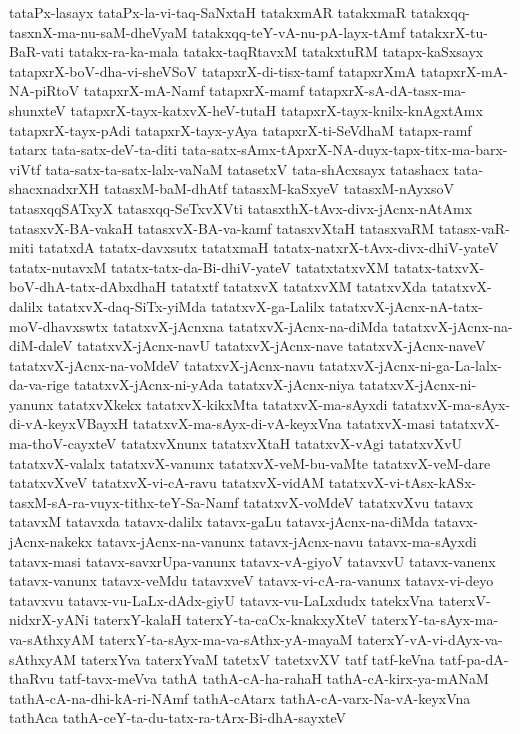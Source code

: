 {tataPx-lasayx
tataPx-la-vi-taq-SaNxtaH
tatakxmAR
tatakxmaR
tatakxqq-tasxnX-ma-nu-saM-dheVyaM
tatakxqq-teY-vA-nu-pA-layx-tAmf
tatakxrX-tu-BaR-vati
tatakx-ra-ka-mala
tatakx-taqRtavxM
tatakxtuRM
tatapx-kaSxsayx
tatapxrX-boV-dha-vi-sheVSoV
tatapxrX-di-tisx-tamf
tatapxrXmA
tatapxrX-mA-NA-piRtoV
tatapxrX-mA-Namf
tatapxrX-mamf
tatapxrX-sA-dA-tasx-ma-shunxteV
tatapxrX-tayx-katxvX-heV-tutaH
tatapxrX-tayx-knilx-knAgxtAmx
tatapxrX-tayx-pAdi
tatapxrX-tayx-yAya
tatapxrX-ti-SeVdhaM
tatapx-ramf
tatarx
tata-satx-deV-ta-diti
tata-satx-sAmx-tApxrX-NA-duyx-tapx-titx-ma-barx-viVtf
tata-satx-ta-satx-lalx-vaNaM
tatasetxV
tata-shAcxsayx
tatashacx
tata-shacxnadxrXH
tatasxM-baM-dhAtf
tatasxM-kaSxyeV
tatasxM-nAyxsoV
tatasxqqSATxyX
tatasxqq-SeTxvXVti
tatasxthX-tAvx-divx-jAcnx-nAtAmx
tatasxvX-BA-vakaH
tatasxvX-BA-va-kamf
tatasxvXtaH
tatasxvaRM
tatasx-vaR-miti
tatatxdA
tatatx-davxsutx
tatatxmaH
tatatx-natxrX-tAvx-divx-dhiV-yateV
tatatx-nutavxM
tatatx-tatx-da-Bi-dhiV-yateV
tatatxtatxvXM
tatatx-tatxvX-boV-dhA-tatx-dAbxdhaH
tatatxtf
tatatxvX
tatatxvXM
tatatxvXda
tatatxvX-dalilx
tatatxvX-daq-SiTx-yiMda
tatatxvX-ga-Lalilx
tatatxvX-jAcnx-nA-tatx-moV-dhavxswtx
tatatxvX-jAcnxna
tatatxvX-jAcnx-na-diMda
tatatxvX-jAcnx-na-diM-daleV
tatatxvX-jAcnx-navU
tatatxvX-jAcnx-nave
tatatxvX-jAcnx-naveV
tatatxvX-jAcnx-na-voMdeV
tatatxvX-jAcnx-navu
tatatxvX-jAcnx-ni-ga-La-lalx-da-va-rige
tatatxvX-jAcnx-ni-yAda
tatatxvX-jAcnx-niya
tatatxvX-jAcnx-ni-yanunx
tatatxvXkekx
tatatxvX-kikxMta
tatatxvX-ma-sAyxdi
tatatxvX-ma-sAyx-di-vA-keyxVBayxH
tatatxvX-ma-sAyx-di-vA-keyxVna
tatatxvX-masi
tatatxvX-ma-thoV-cayxteV
tatatxvXnunx
tatatxvXtaH
tatatxvX-vAgi
tatatxvXvU
tatatxvX-valalx
tatatxvX-vanunx
tatatxvX-veM-bu-vaMte
tatatxvX-veM-dare
tatatxvXveV
tatatxvX-vi-cA-ravu
tatatxvX-vidAM
tatatxvX-vi-tAsx-kASx-tasxM-sA-ra-vuyx-tithx-teY-Sa-Namf
tatatxvX-voMdeV
tatatxvXvu
tatavx
tatavxM
tatavxda
tatavx-dalilx
tatavx-gaLu
tatavx-jAcnx-na-diMda
tatavx-jAcnx-nakekx
tatavx-jAcnx-na-vanunx
tatavx-jAcnx-navu
tatavx-ma-sAyxdi
tatavx-masi
tatavx-savxrUpa-vanunx
tatavx-vA-giyoV
tatavxvU
tatavx-vanenx
tatavx-vanunx
tatavx-veMdu
tatavxveV
tatavx-vi-cA-ra-vanunx
tatavx-vi-deyo
tatavxvu
tatavx-vu-LaLx-dAdx-giyU
tatavx-vu-LaLxdudx
tatekxVna
taterxV-nidxrX-yANi
taterxY-kalaH
taterxY-ta-caCx-knakxyXteV
taterxY-ta-sAyx-ma-va-sAthxyAM
taterxY-ta-sAyx-ma-va-sAthx-yA-mayaM
taterxY-vA-vi-dAyx-va-sAthxyAM
taterxYva
taterxYvaM
tatetxV
tatetxvXV
tatf
tatf-keVna
tatf-pa-dA-thaRvu
tatf-tavx-meVva
tathA
tathA-cA-ha-rahaH
tathA-cA-kirx-ya-mANaM
tathA-cA-na-dhi-kA-ri-NAmf
tathA-cAtarx
tathA-cA-varx-Na-vA-keyxVna
tathAca
tathA-ceY-ta-du-tatx-ra-tArx-Bi-dhA-sayxteV
}
